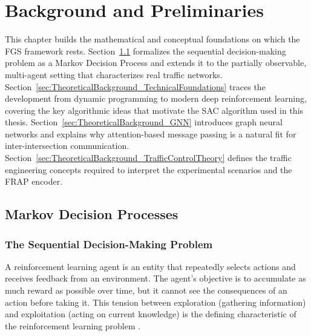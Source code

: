 \chapter{Background and Preliminaries}
\label{ch:TheoreticalBackground}

This chapter builds the mathematical and conceptual foundations on which the FGS framework rests. Section~\ref{sec:TheoreticalBackground_KeyConcepts} formalizes the sequential decision-making problem as a Markov Decision Process and extends it to the partially observable, multi-agent setting that characterizes real traffic networks. Section~\ref{sec:TheoreticalBackground_TechnicalFoundations} traces the development from dynamic programming to modern deep reinforcement learning, covering the key algorithmic ideas that motivate the SAC algorithm used in this thesis. Section~\ref{sec:TheoreticalBackground_GNN} introduces graph neural networks and explains why attention-based message passing is a natural fit for inter-intersection communication. Section~\ref{sec:TheoreticalBackground_TrafficControlTheory} defines the traffic engineering concepts required to interpret the experimental scenarios and the FRAP encoder.

\section{Markov Decision Processes}
\label{sec:TheoreticalBackground_KeyConcepts}

\subsection{The Sequential Decision-Making Problem}
\label{sec:TheoreticalBackground_MDP}

A reinforcement learning agent is an entity that repeatedly selects actions and receives feedback from an environment. The agent's objective is to accumulate as much reward as possible over time, but it cannot see the consequences of an action before taking it. This tension between exploration (gathering information) and exploitation (acting on current knowledge) is the defining characteristic of the reinforcement learning problem \citep{sutton2018reinforcement}.

